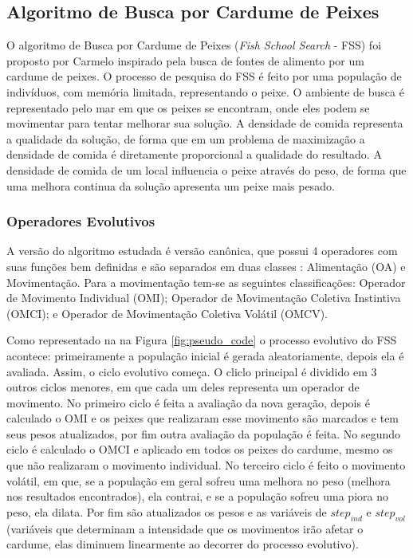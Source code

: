 \subsection{Algoritmo de Busca por Cardume de Peixes}
\label{sec:fish_school_search}
O algoritmo de Busca por Cardume de Peixes (\textit{Fish School Search} - FSS) foi proposto por Carmelo \cite{carmelo2008novel} inspirado pela busca de fontes de alimento por um cardume de peixes. O processo de pesquisa do FSS é feito por uma população de indivíduos, com memória limitada, representando o peixe. O ambiente de busca é representado pelo mar em que os peixes se encontram, onde eles podem se movimentar para tentar melhorar sua solução. A densidade de comida representa a qualidade da solução, de forma que em um problema de maximização a densidade de comida é diretamente proporcional a qualidade do resultado. A densidade de comida de um local influencia o peixe através do peso, de forma que uma melhora continua da solução apresenta um peixe mais pesado.

\subsubsection{Operadores Evolutivos}
\label{sec:evolutionary_operators}
A versão do algoritmo estudada é versão canônica, que possui 4 operadores com suas funções bem definidas e são separados em duas classes \cite{bastos2009influence}: Alimentação (OA) e Movimentação. Para a movimentação tem-se as seguintes classificações: Operador de Movimento Individual (OMI); Operador de Movimentação Coletiva Instintiva (OMCI); e Operador de Movimentação Coletiva Volátil (OMCV).

Como representado na na Figura \ref{fig:pseudo_code} o processo evolutivo do FSS acontece: primeiramente a população inicial é gerada aleatoriamente, depois ela é avaliada. Assim, o ciclo evolutivo começa. O cliclo principal é dividido em 3 outros ciclos menores, em que cada um deles representa um operador de movimento. No primeiro ciclo é feita a avaliação da nova geração, depois é calculado o OMI e os peixes que realizaram esse movimento são marcados e tem seus pesos atualizados, por fim outra avaliação da população é feita. No segundo ciclo é calculado o OMCI e aplicado em todos os peixes do cardume, mesmo os que não realizaram o movimento individual. No terceiro ciclo é feito o movimento volátil, em que, se a população em geral sofreu uma melhora no peso (melhora nos resultados encontrados), ela contrai, e se a população sofreu uma piora no peso, ela dilata. Por fim são atualizados os pesos e as variáveis de $step_{ind}$ e $step_{vol}$ (variáveis que determinam a intensidade que os movimentos irão afetar o cardume, elas diminuem linearmente ao decorrer do processo evolutivo).

